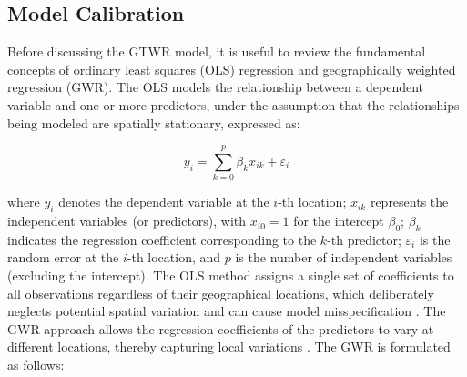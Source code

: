 



\subsection{Model Calibration}
\label{subsec:gtwr_calib}
%
%
Before discussing the GTWR model, it is useful to review the fundamental concepts of ordinary least squares (OLS) regression and geographically weighted regression (GWR). The OLS models the relationship between a dependent variable and one or more predictors, under the assumption that the relationships being modeled are spatially stationary, expressed as:

\begin{equation}
	y_i = \sum_{k=0}^{p} \beta_k x_{ik} + \varepsilon_i
	\label{eq:ols}
\end{equation}

\noindent where \(y_i\) denotes the dependent variable at the \(i\)-th location; \(x_{ik}\) represents the independent variables (or predictors), with \(x_{i0} = 1\) for the intercept \(\beta_0\); \(\beta_k\) indicates the regression coefficient corresponding to the \(k\)-th predictor; \(\varepsilon_i\) is the random error at the \(i\)-th location, and \(p\) is the number of independent variables (excluding the intercept).
%
The OLS method assigns a single set of coefficients to all observations regardless of their geographical locations, which deliberately neglects potential spatial variation and can cause model misspecification \citep{mgwr_book_2017}.
%
%
The GWR approach allows the regression coefficients of the predictors to vary at different locations, thereby capturing local variations \citep{brunsdon1996, fotheringham2002geographically}. The GWR is formulated as follows:

